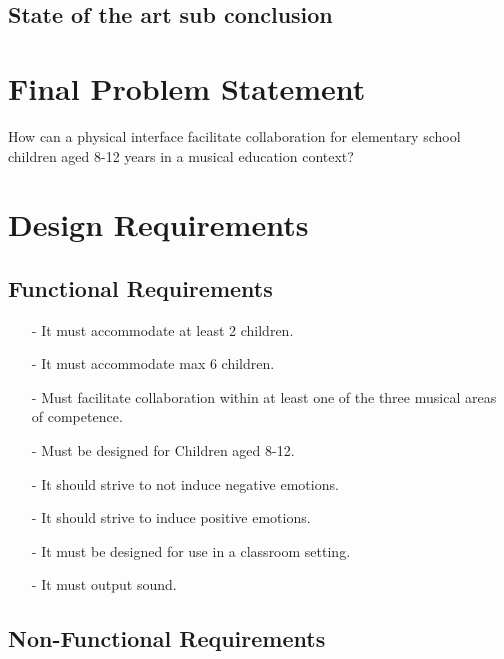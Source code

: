 	 
	\subsection{State of the art sub conclusion}


\section{Final Problem Statement}
	How can a physical interface facilitate collaboration for elementary school children aged 8-12 years in a musical education context?
	
\section{Design Requirements}
	\subsection*{Functional Requirements}
		\begin{itemize}
			\item[-] It must accommodate at least 2 children.\\
			\item[-] It must accommodate max 6 children.\\
			\item[-] Must facilitate collaboration within at least one of the three musical areas of competence.\\
			\item[-] Must be designed for Children aged 8-12.\\
			\item[-] It should strive to not induce  negative emotions.\\
			\item[-] It should strive to induce positive emotions.\\
			\item[-] It must be designed for use in a classroom setting.\\
			\item[-] It must output sound.
		\end{itemize}
	\subsection*{Non-Functional Requirements}
		
	
















		